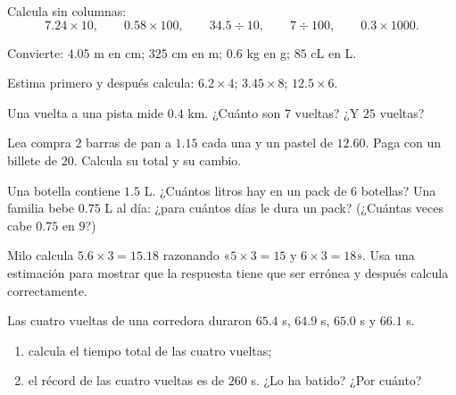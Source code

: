 \begin{exercise}[$\star$]\label{exo:g5:decimalops:4}
Calcula sin columnas:
\[
7.24 \times 10, \qquad
0.58 \times 100, \qquad
34.5 \div 10, \qquad
7 \div 100, \qquad
0.3 \times 1000 .
\]
\end{exercise}

\begin{exercise}[$\star$]\label{exo:g5:decimalops:5}
Convierte: $4.05$ m en cm; \quad $325$ cm en m; \quad $0.6$ kg en g;
\quad $85$ cL en L.
\end{exercise}

\begin{exercise}[$\star$]\label{exo:g5:decimalops:6}
Estima primero y después calcula: $6.2 \times 4$; \quad
$3.45 \times 8$; \quad $12.5 \times 6$.
\end{exercise}

\begin{exercise}[$\star$]\label{exo:g5:decimalops:7}
Una vuelta a una pista mide $0.4$ km. ¿Cuánto son $7$ vueltas? ¿Y
$25$ vueltas?
\end{exercise}

\begin{exercise}[$\star$]\label{exo:g5:decimalops:8}
Lea compra $2$ barras de pan a $1.15$ cada una y un pastel de $12.60$.
Paga con un billete de $20$. Calcula su total y su cambio.
\end{exercise}

\begin{exercise}[$\star$]\label{exo:g5:decimalops:9}
Una botella contiene $1.5$ L. ¿Cuántos litros hay en un pack de $6$ botellas?
Una familia bebe $0.75$ L al día: ¿para cuántos días le dura un pack?
(¿Cuántas veces cabe $0.75$ en $9$?)
\end{exercise}

\begin{exercise}[$\star\star$]\label{exo:g5:decimalops:10}
Milo calcula $5.6 \times 3 = 15.18$ razonando «$5 \times 3 = 15$
y $6 \times 3 = 18$». Usa una estimación para mostrar que la respuesta tiene que ser
errónea y después calcula correctamente.
\end{exercise}

\begin{exercise}[$\star\star$]\label{exo:g5:decimalops:11}
Las cuatro vueltas de una corredora duraron $65.4$ s, $64.9$ s, $65.0$ s y
$66.1$ s.
\begin{enumerate}
  \item calcula el tiempo total de las cuatro vueltas;
  \item el récord de las cuatro vueltas es de $260$ s. ¿Lo ha batido? ¿Por
        cuánto?
\end{enumerate}
\end{exercise}
